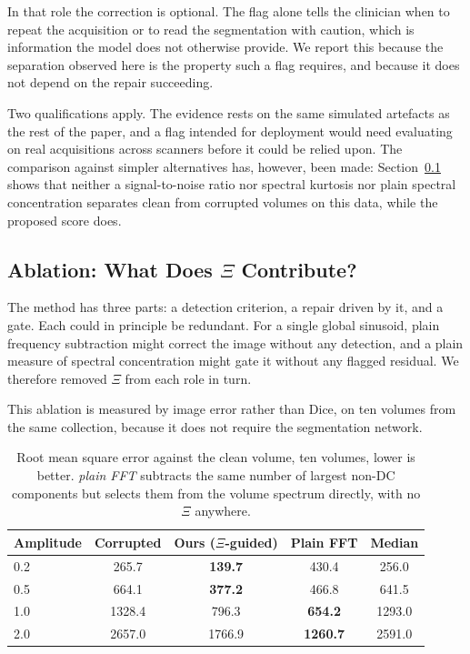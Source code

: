 \documentclass[12pt]{article}
\theoremstyle{definition}
\theoremstyle{plain}
\begin{document}
In that role the correction is optional. The flag alone tells the clinician when to
repeat the acquisition or to read the segmentation with caution, which is
information the model does not otherwise provide. We report this because the
separation observed here is the property such a flag requires, and because it does
not depend on the repair succeeding.

Two qualifications apply. The evidence rests on the same simulated artefacts as the
rest of the paper, and a flag intended for deployment would need evaluating on real
acquisitions across scanners before it could be relied upon. The comparison against
simpler alternatives has, however, been made: Section~\ref{sec:ablation} shows that
neither a signal-to-noise ratio nor spectral kurtosis nor plain spectral
concentration separates clean from corrupted volumes on this data, while the proposed
score does.

\subsection{Ablation: What Does $\Xi$ Contribute?}\label{sec:ablation}

The method has three parts: a detection criterion, a repair driven by it, and a
gate. Each could in principle be redundant. For a single global sinusoid, plain
frequency subtraction might correct the image without any detection, and a plain
measure of spectral concentration might gate it without any flagged residual. We
therefore removed $\Xi$ from each role in turn.

This ablation is measured by image error rather than Dice, on ten volumes from the
same collection, because it does not require the segmentation network.

\begin{table}[H]
\centering
\caption{Root mean square error against the clean volume, ten volumes, lower is
better. \emph{plain FFT} subtracts the same number of largest non-DC components but
selects them from the volume spectrum directly, with no $\Xi$ anywhere.}
\begin{tabular}{lcccc}
\toprule
Amplitude & Corrupted & Ours ($\Xi$-guided) & Plain FFT & Median \\
\midrule
0.2 & 265.7 & \textbf{139.7} & 430.4 & 256.0 \\
0.5 & 664.1 & \textbf{377.2} & 466.8 & 641.5 \\
1.0 & 1328.4 & 796.3 & \textbf{654.2} & 1293.0 \\
2.0 & 2657.0 & 1766.9 & \textbf{1260.7} & 2591.0 \\
\bottomrule
\end{tabular}
\end{table}
\end{document}

